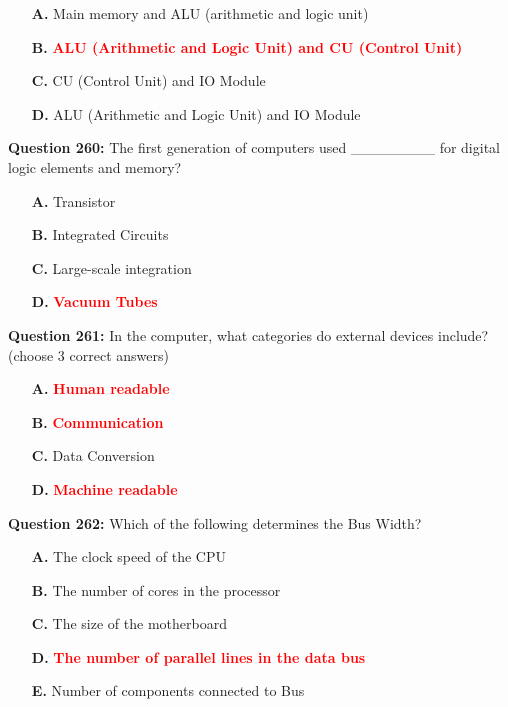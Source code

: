 \documentclass[12pt,a4paper]{article}
\begin{document}
\begin{itemize}
    \item[\textbf{A.}] Main memory and ALU (arithmetic and logic unit)
    \item[\textbf{B.}] \textcolor{red}{\textbf{ALU (Arithmetic and Logic Unit) and CU (Control Unit)}}
    \item[\textbf{C.}] CU (Control Unit) and IO Module
    \item[\textbf{D.}] ALU (Arithmetic and Logic Unit) and IO Module
\end{itemize}

\vspace{0.5cm}

\textbf{Question 260:} The first generation of computers used ________ for digital logic elements and memory?

\begin{itemize}
    \item[\textbf{A.}] Transistor
    \item[\textbf{B.}] Integrated Circuits
    \item[\textbf{C.}] Large-scale integration
    \item[\textbf{D.}] \textcolor{red}{\textbf{Vacuum Tubes}}
\end{itemize}

\vspace{0.5cm}

\textbf{Question 261:} In the computer, what categories do external devices include? (choose 3 correct answers)

\begin{itemize}
    \item[\textbf{A.}] \textcolor{red}{\textbf{Human readable}}
    \item[\textbf{B.}] \textcolor{red}{\textbf{Communication}}
    \item[\textbf{C.}] Data Conversion
    \item[\textbf{D.}] \textcolor{red}{\textbf{Machine readable}}
\end{itemize}

\vspace{0.5cm}

\textbf{Question 262:} Which of the following determines the Bus Width?

\begin{itemize}
    \item[\textbf{A.}] The clock speed of the CPU
    \item[\textbf{B.}] The number of cores in the processor
    \item[\textbf{C.}] The size of the motherboard
    \item[\textbf{D.}] \textcolor{red}{\textbf{The number of parallel lines in the data bus}}
    \item[\textbf{E.}] Number of components connected to Bus
\end{itemize}
\end{document}
